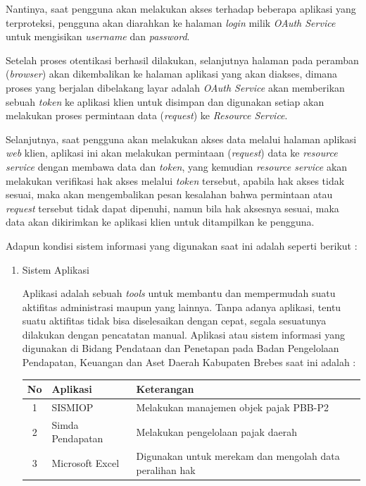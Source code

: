 \documentclass[pdftex,12pt, oneside]{article}
\begin{document}
\begin{enumerate}
\begin{enumerate}
Nantinya, saat pengguna akan melakukan akses terhadap beberapa aplikasi yang terproteksi, pengguna akan diarahkan ke halaman \textit{login} milik \textit{OAuth Service} untuk mengisikan \textit{username} dan \textit{password}. 

Setelah proses otentikasi berhasil dilakukan, selanjutnya halaman pada peramban (\textit{browser}) akan dikembalikan ke halaman aplikasi yang akan diakses, dimana proses yang berjalan dibelakang layar adalah \textit{OAuth Service} akan memberikan sebuah \textit{token} ke aplikasi klien untuk disimpan dan digunakan setiap akan melakukan proses permintaan data (\textit{request}) ke \textit{Resource Service}. 

Selanjutnya, saat pengguna akan melakukan akses data melalui halaman aplikasi \textit{web} klien, aplikasi ini akan melakukan permintaan (\textit{request}) data ke \textit{resource service} dengan membawa data dan \textit{token}, yang kemudian \textit{resource service} akan melakukan verifikasi hak akses melalui \textit{token} tersebut, apabila hak akses tidak sesuai, maka akan mengembalikan pesan kesalahan bahwa permintaan atau \textit{request} tersebut tidak dapat dipenuhi, namun bila hak aksesnya sesuai, maka data akan dikirimkan ke aplikasi klien untuk ditampilkan ke pengguna.
	
\end{enumerate}

Adapun kondisi sistem informasi yang digunakan saat ini adalah seperti berikut :

\begin{enumerate}
	\item Sistem Aplikasi 
	
Aplikasi adalah sebuah \textit{tools} untuk membantu dan mempermudah suatu aktifitas administrasi maupun yang lainnya. Tanpa adanya aplikasi, tentu suatu aktifitas tidak bisa diselesaikan dengan cepat, segala sesuatunya dilakukan dengan pencatatan manual. Aplikasi atau sistem informasi yang digunakan di Bidang Pendataan dan Penetapan pada Badan Pengelolaan Pendapatan, Keuangan dan Aset Daerah Kabupaten Brebes saat ini adalah :

\begin{table}[H]
	\centering
	\begin{tabular}{| c | l | l |}
		\hline
		No & Aplikasi & Keterangan \\
		\hline
		1 & SISMIOP & Melakukan manajemen objek pajak PBB-P2 \\
		\hline
		2 & Simda Pendapatan & Melakukan pengelolaan pajak daerah \\
		\hline
		3 & Microsoft Excel & Digunakan untuk merekam dan mengolah data peralihan hak \\
		\hline
	\end{tabular}
\end{table}


\end{enumerate}
\end{enumerate}
\end{document}
